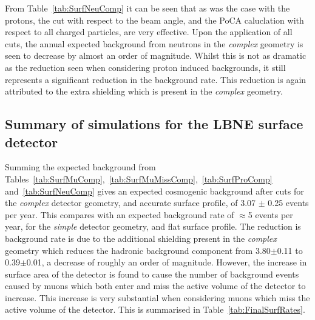 From Table~\ref{tab:SurfNeuComp} it can be seen that as was the case with the protons, the cut with respect to the beam angle, and the PoCA caluclation with respect to all charged particles, are very effective. Upon the application of all cuts, the annual expected background from neutrons in the \emph{complex} geometry is seen to decrease by almost an order of magnitude. Whilst this is not as dramatic as the reduction seen when considering proton induced backgrounds, it still represents a significant reduction in the background rate. This reduction is again attributed to the extra shielding which is present in the \emph{complex} geometry. \\

\subsection{Summary of simulations for the LBNE surface detector}
Summing the expected background from Tables~\ref{tab:SurfMuComp},~\ref{tab:SurfMuMissComp},~\ref{tab:SurfProComp} and~\ref{tab:SurfNeuComp} gives an expected cosmogenic background after cuts for the \emph{complex} detector geometry, and accurate surface profile, of 3.07 $\pm$ 0.25 events per year. This compares with an expected background rate of $\approx$5 events per year, for the \emph{simple} detector geometry, and flat surface profile. The reduction is background rate is due to the additional shielding present in the \emph{complex} geometry which reduces the hadronic background component from 3.80$\pm$0.11 to 0.39$\pm$0.01, a decrease of roughly an order of magnitude. However, the increase in surface area of the detector is found to cause the number of background events caused by muons which both enter and miss the active volume of the detector to increase. This increase is very substantial when considering muons which miss the active volume of the detector. This is summarised in Table~\ref{tab:FinalSurfRates}. \\

